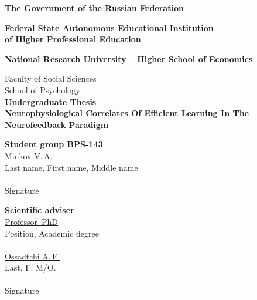\documentclass[14pt,a4paper]{scrartcl}
\begin{document}
	\begin{titlepage}
		  \begin{center}
		    \large
		    \textbf{The Government of the Russian Federation}
		    
		    \textbf{Federal State Autonomous Educational Institution\\of Higher Professional Education}
		    \vspace{0.25cm}
		    
		   \textbf{National Research University – Higher School of Economics}
		   \vspace{0.25cm}

		   	Faculty of Social Sciences
		    \\School of Psychology\\[1cm]
		    
		    \textbf{Undergraduate Thesis}
		    \\[0.5cm]
		    \textbf{\guillemotleft Neurophysiological Correlates Of Efficient Learning In The Neurofeedback Paradigm \guillemotright}
		    \vfill
		     
			\end{center}

	\newlength{\ML}
	\hfill\begin{minipage}{0.4\textwidth}
	  \textbf{Student group BPS-143}\\[0.3cm]
	  \underline{Minkov V.\,A.} \\
	  \scriptsize{Last name, First name, Middle name}\\\\
	  \large
	  \underline{\hspace{7cm}}
	  \scriptsize{Signature}\\
			\end{minipage}%


	\hfill\begin{minipage}{0.4\textwidth}
	  \textbf{Scientific adviser}\\[0.3cm]
	  \underline{Professor\, PhD} \\
	  \scriptsize{Position, Academic degree}\\\\
	  \large
	  \underline{Ossadtchi A.\,E.} \\
	  \scriptsize{Last, F. M/O.}\\\\
	  \underline{\hspace{7cm}}
	  \scriptsize{Signature}\\
			\end{minipage}


\end{titlepage}
\end{document}
